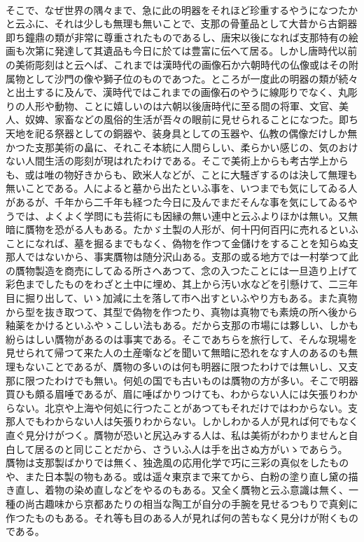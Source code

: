 \documentclass[8pt]{extreport}
\begin{document}
\begin{CJK}{UTF8}{min}
\\	そこで、なぜ世界の隅々まで、急に此の明器をそれほど珍重するやうになつたかと云ふに、それは少しも無理も無いことで、支那の骨董品として大昔から古銅器即ち鐘鼎の類が非常に尊重されたものであるし、唐宋以後になれば支那特有の絵画も次第に発達して其遺品も今日に於ては豊富に伝へて居る。しかし唐時代以前の美術彫刻はと云へば、これまでは漢時代の画像石か六朝時代の仏像或はその附属物として沙門の像や獅子位のものであつた。ところが一度此の明器の類が続々と出土するに及んで、漢時代ではこれまでの画像石のやうに線彫りでなく、丸彫りの人形や動物、ことに嬉しいのは六朝以後唐時代に至る間の将軍、文官、美人、奴婢、家畜などの風俗的生活が吾々の眼前に見せられることになつた。即ち天地を祀る祭器としての銅器や、装身具としての玉器や、仏教の偶像だけしか無かつた支那美術の畠に、それこそ本統に人間らしい、柔らかい感じの、気のおけない人間生活の彫刻が現はれたわけである。そこで美術上からも考古学上からも、或は唯の物好きからも、欧米人などが、ことに大騒ぎするのは決して無理も無いことである。人によると墓から出たといふ事を、いつまでも気にしてゐる人があるが、千年から二千年も経つた今日に及んでまだそんな事を気にしてゐるやうでは、よくよく学問にも芸術にも因縁の無い連中と云ふよりほかは無い。又無暗に贋物を恐がる人もある。たかゞ土製の人形が、何十円何百円に売れるといふことになれば、墓を掘るまでもなく、偽物を作つて金儲けをすることを知らぬ支那人ではないから、事実贋物は随分沢山ある。支那の或る地方では一村挙つて此の贋物製造を商売にしてゐる所さへあつて、念の入つたことには一旦造り上げて彩色までしたものをわざと土中に埋め、其上から汚い水などを引懸けて、二三年目に掘り出して、いゝ加減に土を落して市へ出すといふやり方もある。また真物から型を抜き取つて、其型で偽物を作つたり、真物は真物でも素焼の所へ後から釉薬をかけるといふやゝこしい法もある。だから支那の市場には夥しい、しかも紛らはしい贋物があるのは事実である。そこであちらを旅行して、そんな現場を見せられて帰つて来た人の土産噺などを聞いて無暗に恐れをなす人のあるのも無理もないことであるが、贋物の多いのは何も明器に限つたわけでは無いし、又支那に限つたわけでも無い。何処の国でも古いものは贋物の方が多い。そこで明器買ひも頗る眉唾であるが、眉に唾ばかりつけても、わからない人には矢張りわからない。北京や上海や何処に行つたことがあつてもそれだけではわからない。支那人でもわからない人は矢張りわからない。しかしわかる人が見れば何でもなく直ぐ見分けがつく。贋物が恐いと尻込みする人は、私は美術がわかりませんと自白して居るのと同じことだから、さういふ人は手を出さぬ方がいゝであらう。
\\	贋物は支那製ばかりでは無く、独逸風の応用化学で巧に三彩の真似をしたものや、また日本製の物もある。或は遥々東京まで来てから、白粉の塗り直し黛の描き直し、着物の染め直しなどをやるのもある。又全く贋物と云ふ意識は無く、一種の尚古趣味から京都あたりの相当な陶工が自分の手腕を見せるつもりで真剣に作つたものもある。それ等も目のある人が見れば何の苦もなく見分けが附くものである。

\end{CJK}
\end{document}
